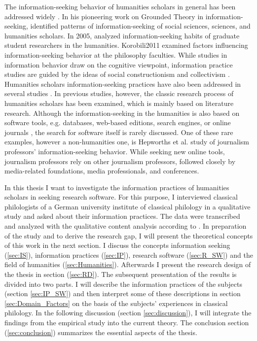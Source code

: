 \documentclass[12pt, a4paper, titlepage, oneside, abstract=true, toc=listof, toc=bibliography, BCOR=1cm]{scrreprt}
\begin{document}
The information-seeking behavior of humanities scholars in general has been addressed widely \citep[e.g.][]{Barrett2005, Bronstein2007, Bronstein2007a, Catalano2013, Ellis1993, Given2018, Korobili2011, Liew2006, Rimmer2006}. In his pioneering work on Grounded Theory in information-seeking, \citet{Ellis1993} identified patterns of information-seeking of social sciences, sciences, and humanities scholars. In 2005, \citet{Barrett2005} analyzed information-seeking habits of graduate student researchers in the humanities. Korobili{2011} examined factors influencing information-seeking behavior at the philosophy faculties. While studies in information behavior draw on the cognitive viewpoint, information practice studies are guided by the ideas of social constructionism and collectivism \citep{Savolainen2007, Talja2005, Talja2007}. Humanities scholars information-seeking practices have also been addressed in several studies \citep{Benardou2013, Bulger2011, Given2018, Palmer2009}. In previous studies, however, the classic research process of humanities scholars has been examined, which is mainly based on literature research. Although the information-seeking in the humanities is also based on software tools, e.g. databases, web-based editions, search engines, or online journals \citep{Barrett2005, Rimmer2006}, the search for software itself is rarely discussed. One of these rare examples, however a non-humanities one, is Hepworths et al. \citeyearpar{Hepworth2017} study of journalism professors' information-seeking behavior. While seeking new online tools, journalism professors rely on other journalism professors, followed closely by media-related foundations, media professionals, and conferences.

In this thesis I want to investigate the information practices of humanities scholars in seeking research software. For this purpose, I interviewed classical philologists of a German university institute of classical philology in a qualitative study and asked about their information practices. The data were transcribed and analyzed with the qualitative content analysis according to \citet{Mayring2014}. In preparation of the study and to derive the research gap, I will present the theoretical concepts of this work in the next section. I discuss the concepts information seeking (\ref{sec:IS}), information practices (\ref{sec:IP}), research software (\ref{sec:R_SW}) and the field of humanities (\ref{sec:Humanities}). Afterwards I present the research design of the thesis in section (\ref{sec:RD}). The subsequent presentation of the results is divided into two parts. I will describe the information practices of the subjects (section \ref{sec:IP_SW}) and then interpret some of these descriptions in section \ref{sec:Domain_Factors} on the basis of the subjects' experiences in classical philology. In the following discussion (section \ref{sec:discussion}), I will integrate the findings from the empirical study into the current theory. The conclusion section (\ref{sec:conclusion}) summarizes the essential aspects of the thesis.
\end{document}
